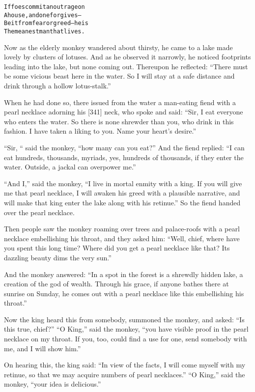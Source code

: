 \documentclass{article}
\renewenvironment{verbatim}{\begin{alltt}\normalfont\begin{centering}}{\end{centering}\end{alltt}}
\begin{document}
\begin{verbatim}
If foes commit an outrage on
    A house, and one forgives--
Be it from fear or greed--he is
    The meanest man that lives.
\end{verbatim}
Now as the elderly monkey wandered about thirsty, he came to a lake
made lovely by clusters of lotuses. And as he observed it narrowly,
he noticed footprints leading into the lake, but none coming out.
Thereupon he reflected:
``There must be some vicious beast here in the water. So I will stay at a safe distance and drink through a hollow lotus-stalk.''

When he had done so, there issued from the water a man-eating fiend
with a pearl necklace adorning his [341] neck, who spoke and said:
``Sir, I eat everyone who enters the water. So there is none shrewder than you, who drink in this fashion. I have taken a liking to you. Name your heart's desire.''

``Sir, “ said the monkey, “how many can you eat?'' And the fiend
replied:
``I can eat hundreds, thousands, myriads, yes, hundreds of thousands, if they enter the water. Outside, a jackal can overpower me.''

``And I,'' said the monkey,
``I live in mortal enmity with a king. If you will give me that pearl necklace, I will awaken his greed with a plausible narrative, and will make that king enter the lake along with his retinue.''
So the fiend handed over the pearl necklace.

Then people saw the monkey roaming over trees and palace-roofs with
a pearl necklace embellishing his throat, and they asked him:
``Well, chief, where have you spent this long time? Where did you get a pearl necklace like that? Its dazzling beauty dims the very sun.''

And the monkey answered:
``In a spot in the forest is a shrewdly hidden lake, a creation of the god of wealth. Through his grace, if anyone bathes there at sunrise on Sunday, he comes out with a pearl necklace like this embellishing his throat.''

Now the king heard this from somebody, summoned the monkey, and
asked: ``Is this true, chief?'' ``O King,'' said the monkey,
``you have visible proof in the pearl necklace on my throat. If you, too, could find a use for one, send somebody with me, and I will show him.''

On hearing this, the king said:
``In view of the facts, I will come myself with my retinue, so that we may acquire numbers of pearl necklaces.''
``O King,'' said the monkey, ``your idea is delicious.''
\end{document}
